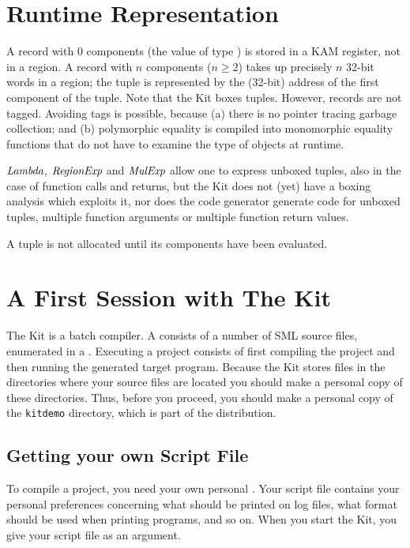 \documentclass[12pt]{book}
\begin{document}
\section{Runtime Representation}
A record with 0 components (the value of type ) 
is stored in a KAM register, not in a region.
A record with $n$ components ($n\geq 2$) takes up precisely $n$ 32-bit words in a region;
the tuple is represented by the (32-bit) address of the first component of the tuple.
Note that the Kit boxes tuples.
However, records are not tagged. Avoiding tags is possible, because
(a) there is no pointer tracing garbage collection; and (b) 
polymorphic equality is 
compiled into monomorphic 
equality functions that do not have
to examine the type of objects at runtime. 

$\hbox{\it Lambda}$, $\hbox{\it RegionExp}$ and $\hbox{\it MulExp}$ allow one to express unboxed tuples, 
also in the case of function calls and returns, but the Kit does not 
(yet) have a boxing analysis which exploits it, nor does the 
code generator generate code for unboxed tuples, multiple function arguments 
or multiple function return values.

A tuple is not allocated until its components have been evaluated.

\section{A First Session with The Kit}
\label{tryit.sec}
The Kit is a batch compiler.  A
 consists of a number of SML source files,
enumerated in a . Executing a
project consists of first compiling the project and then running the
generated target program. Because the Kit stores files in the
directories where your source files are located you should make a
personal copy of these directories. Thus, before you proceed, you
should make a personal copy of the {\tt kitdemo} directory, which is
part of the distribution.

\subsection{Getting your own Script File}
To compile a project, you need your own personal . Your script file contains your personal
preferences concerning what should be printed on log files, what
format should be used when printing programs, and so on. When you
start the Kit, you give your script file as an argument.
\end{document}
